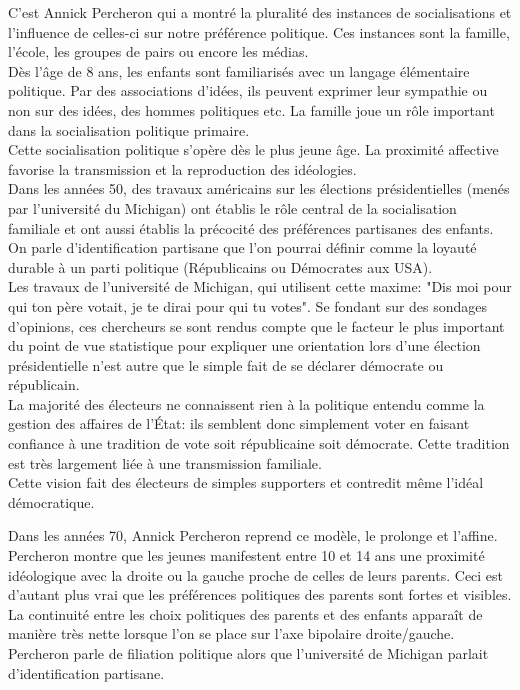 \documentclass[12pt, a4paper, openany]{book}
\begin{document}
C'est Annick Percheron qui a montré la pluralité des instances de socialisations et l'influence de celles-ci sur notre préférence politique. Ces instances sont la famille, l'école, les groupes de pairs ou encore les médias. \\
Dès l'âge de 8 ans, les enfants sont familiarisés avec un langage élémentaire politique. Par des associations d'idées, ils peuvent exprimer leur sympathie ou non sur des idées, des hommes politiques etc. La famille joue un rôle important dans la socialisation politique primaire. \\
Cette socialisation politique s'opère dès le plus jeune âge. La proximité affective favorise la transmission et la reproduction des idéologies. \\
Dans les années 50, des travaux américains sur les élections présidentielles (menés par l'université du Michigan) ont établis le rôle central de la socialisation familiale et ont aussi établis la précocité des préférences partisanes des enfants. On parle d'identification partisane que l'on pourrai définir comme la loyauté durable à un parti politique (Républicains ou Démocrates aux USA). \\
Les travaux de l'université de Michigan, qui utilisent cette maxime: "Dis moi pour qui ton père votait, je te dirai pour qui tu votes". Se fondant sur des sondages d'opinions, ces chercheurs se sont rendus compte que le facteur le plus important du point de vue statistique pour expliquer une orientation lors d'une élection présidentielle n'est autre que le simple fait de se déclarer démocrate ou républicain. \\
La majorité des électeurs ne connaissent rien à la politique entendu comme la gestion des affaires de l'État: ils semblent donc simplement voter en faisant confiance à une tradition de vote soit républicaine soit démocrate. Cette tradition est très largement liée à une transmission familiale. \\
Cette vision fait des électeurs de simples supporters et contredit même l'idéal démocratique.


Dans les années 70, Annick Percheron reprend ce modèle, le prolonge et l'affine. \\
Percheron montre que les jeunes manifestent entre 10 et 14 ans une proximité idéologique avec la droite ou la gauche proche de celles de leurs parents. Ceci est d'autant plus vrai que les préférences politiques des parents sont fortes et visibles. \\
La continuité entre les choix politiques des parents et des enfants apparaît de manière très nette lorsque l'on se place sur l'axe bipolaire droite/gauche. \\
Percheron parle de filiation politique alors que l'université de Michigan parlait d'identification partisane.
\end{document}
